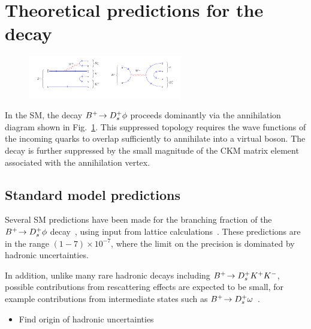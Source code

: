 \section{Theoretical predictions for the \decay{\Bp}{\Dsp\phiz} decay}

\begin{figure}[!h]
    \centering
    \includegraphics[width=0.6\textwidth]{figs/Theory/B2DsPhi.pdf}
    \caption{\decay{\Bp}{\Dsp\phiz} }
    \label{fig:Theory_DsPhiDiagram}   
\end{figure}



{\color{Blue}
In the SM, the decay ${{{B}^+}}\!\rightarrow {\ensuremath{{D}^+_{s}}}\phi$ proceeds dominantly via the annihilation diagram shown in Fig.~\ref{fig:Theory_DsPhiDiagram}. 
This suppressed topology requires the wave functions of the incoming quarks to overlap sufficiently to annihilate into a virtual \Wp boson. 
The decay is further suppressed by the small magnitude of the CKM matrix element \Vub associated with the annihilation vertex. 


}

\subsection{Standard model predictions}
{\color{Blue}
Several SM predictions have been made for the branching fraction of the ${{{B}^+}}\!\rightarrow {\ensuremath{{D}^+_{s}}}\phi$ decay~\cite{Zou:2009zza, Mohanta:2002wf, Mohanta:2007uu, Lu:2001yz}, using input from lattice calculations~\cite{fB:2013HPQCD,fB:2016ETM, fB:2016Fermi}. These predictions are in the range $(1-7)\times10^{-7}$, where the limit on the precision is dominated by hadronic uncertainties. 

In addition, unlike many rare hadronic decays including ${{{B}^+}}\!\rightarrow {\ensuremath{{D}^+_{s}}}{\ensuremath{{K}^+}}{\ensuremath{{K}^-}}$, possible contributions from rescattering effects are expected to be small, for example contributions from intermediate states such as ${{{B}^+}}\!\rightarrow {\ensuremath{{D}^+_{s}}}\omega$~\cite{Gronau:2012gs}.

}

{\color{Red}
\begin{itemize}
\item Find origin of hadronic uncertainties 
\end{itemize}}

